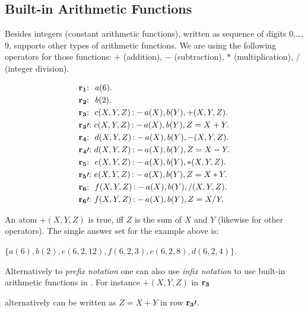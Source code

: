 \documentclass[a4paper, titlepage]{article}
\DeclareMathOperator{\leftimpl}{:-}
\newcommand\mycenterline[1]{\par\smallskip\centerline{#1} \smallskip}
\newcommand{\row}[1]{%
  \ensuremath{\color{black}\ensuremath{\mathbf{#1}} \color{black}}%
}
\newcommand{\rowprefix}[1]{%
  \ensuremath{\color{black}\mathbf{#1{:}}\ }%
}
\newcommand{\rowprefixprime}[1]{%
  \ensuremath{\color{black}\mathbf{#1\prime{:}}\ }%
}
\begin{document}
\subsection{Built-in Arithmetic Functions}
Besides integers (constant arithmetic functions), written 
as sequence of digits $0$,\dots,$9$, \dlvhex{} supports 
other types of arithmetic functions. We are using the 
following operators for those functions: $+$ (addition), 
$-$ (subtraction), $*$ (multiplication), $/$ (integer 
division). 
\begin{exmp}
\begin{align*}
&\rowprefix{r_1} \ \mathit{a}(6). \\
&\rowprefix{r_2} \ \mathit{b}(2). \\
&\rowprefix{r_3} \ c(X,Y,Z) \leftimpl a(X), b(Y),+(X, Y, Z). \\
&\rowprefixprime{r_3} c(X,Y,Z) \leftimpl a(X), b(Y),Z=X+Y. \\
&\rowprefix{r_4}  \ d(X,Y,Z) \leftimpl a(X), b(Y),-(X, Y, Z). \\
&\rowprefixprime{r_4} d(X,Y,Z) \leftimpl a(X), b(Y),Z=X-Y. \\
&\rowprefix{r_5} \ e(X,Y,Z) \leftimpl a(X), b(Y),*(X, Y, Z). \\
&\rowprefixprime{r_5} e(X,Y,Z) \leftimpl a(X), b(Y),Z=X*Y. \\
&\rowprefix{r_6} \ f(X,Y,Z) \leftimpl a(X), b(Y),/(X, Y, Z). \\
&\rowprefixprime{r_6} f(X,Y,Z) \leftimpl a(X), b(Y),Z=X/Y. \\
\end{align*}
\end{exmp}
An atom $+(X,Y,Z)$ is true, iff $Z$ is the sum of $X$ and $Y$ (likewise for other operators).
The single answer set for the example above is:
\mycenterline{$\mathit{\{a(6),b(2),e(6,2,12),f(6,2,3),c(6,2,8),d(6,2,4)\}}$.}
Alternatively to \emph{prefix notation} one can also use 
\emph{infix notation} to use built-in arithmetic functions 
in \dlvhex{}. For instance $\mathit{+(X, Y, Z)}$ in \row{r_3} 
alternatively can be written as $\mathit{Z=X+Y}$ in row $\row{r_3}\prime$. 
\end{document}

